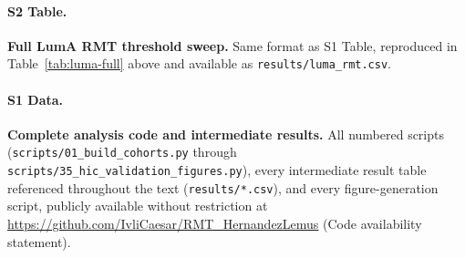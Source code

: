 \documentclass[11pt]{article}
\begin{document}
\paragraph{S2 Table.}
\textbf{Full LumA RMT threshold sweep.} Same format as S1 Table,
reproduced in Table~\ref{tab:luma-full} above and available as
\texttt{results/luma\_rmt.csv}.

\paragraph{S1 Data.}
\textbf{Complete analysis code and intermediate results.} All numbered
scripts (\texttt{scripts/01\_build\_cohorts.py} through
\texttt{scripts/35\_hic\_validation\_figures.py}), every intermediate
result table referenced throughout the text
(\texttt{results/*.csv}), and every figure-generation script, publicly
available without restriction at
\url{https://github.com/IvliCaesar/RMT_HernandezLemus} (Code
availability statement).
\end{document}
